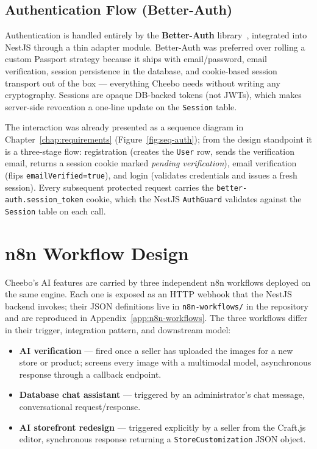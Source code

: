 \documentclass[12pt, a4paper, oneside]{report}
\begin{document}
\subsection{Authentication Flow (Better-Auth)}

Authentication is handled entirely by the \textbf{Better-Auth}
library~\cite{betterauth}, integrated into NestJS through a thin adapter module.
Better-Auth was preferred over rolling a custom Passport
strategy because it ships with email/password, email
verification, session persistence in the database, and
cookie-based session transport out of the box --- everything
Cheebo needs without writing any cryptography. Sessions are
opaque DB-backed tokens (not JWTs), which makes server-side
revocation a one-line update on the \texttt{Session} table.

The interaction was already presented as a sequence diagram in
Chapter~\ref{chap:requirements} (Figure~\ref{fig:seq-auth}); from the
design standpoint it is a three-stage flow:
registration (creates the \texttt{User} row, sends the
verification email, returns a session cookie marked
\emph{pending verification}), email verification (flips
\texttt{emailVerified=true}), and login (validates credentials
and issues a fresh session). Every subsequent protected
request carries the \texttt{better-auth.session\_token} cookie,
which the NestJS \texttt{AuthGuard} validates against the
\texttt{Session} table on each call.

\section{n8n Workflow Design}

Cheebo's AI features are carried by three independent n8n workflows
deployed on the same engine. Each one is exposed as an HTTP webhook
that the NestJS backend invokes; their JSON definitions live in
\texttt{n8n-workflows/} in the repository and are reproduced in
Appendix~\ref{app:n8n-workflows}. The three workflows differ in
their trigger, integration pattern, and downstream model:

\begin{itemize}[leftmargin=*,itemsep=2pt]
  \item \textbf{AI verification} --- fired once a seller has uploaded
        the images for a new store or product; screens every image
        with a multimodal model, asynchronous response through a
        callback endpoint.
  \item \textbf{Database chat assistant} --- triggered by an
        administrator's chat message, conversational
        request/response.
  \item \textbf{AI storefront redesign} --- triggered explicitly
        by a seller from the Craft.js editor, synchronous response
        returning a \texttt{StoreCustomization} JSON object.
\end{itemize}
\end{document}
